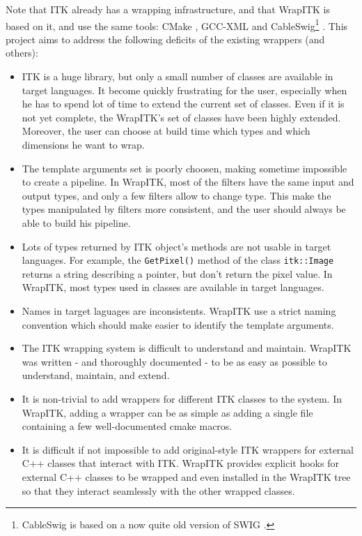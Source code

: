 \documentclass{InsightArticle}
\begin{document}
Note that ITK already has a wrapping infrastructure, and that WrapITK is based
on it, and use the same tools: CMake \cite{CMakeWebSite}, GCC-XML \cite{GccxmlWebsite}
and CableSwig\footnote{CableSwig is based on a now quite old version of SWIG
\cite{SwigWebSite}.} \cite{CableSwigWebSite}. This project aims to
address the following deficits of the existing wrappers (and others):
\begin{itemize}
  \item  ITK is a huge library, but only a small number of classes are available
in target languages. It become quickly frustrating for the user, especially when
he has to spend lot of time to extend the current set of classes. Even if it is
not yet complete, the WrapITK's set of classes have been highly extended. Moreover,
the user can choose at build time which types and which dimensions he want to wrap.

  \item  The template arguments set is poorly choosen, making sometime impossible
to create a pipeline. In WrapITK, most of the filters have the same input and output
types, and only a few filters allow to change type. This make the types manipulated 
by filters more consistent, and the user should always be able to build his pipeline.

  \item  Lots of types returned by ITK object's methods are not usable in target
languages. For example, the \verb$GetPixel()$ method of the class \verb$itk::Image$
returns a string describing a pointer, but don't return the pixel value. In WrapITK,
most types used in classes are available in target languages.

  \item  Names in target laguages are inconsistents. WrapITK use a strict naming
convention which should make easier to identify the template arguments.

  \item  The ITK wrapping system is difficult to understand and maintain. WrapITK was
written - and thoroughly documented - to be as easy as possible to understand,
maintain, and extend.

  \item  It is non-trivial to add wrappers for different ITK classes to the system. In
WrapITK, adding a wrapper can be as simple as adding a single file containing a
few well-documented cmake macros.

  \item  It is difficult if not impossible to add original-style ITK wrappers for
external C++ classes that interact with ITK. WrapITK provides explicit hooks for
external C++ classes to be wrapped and even installed in the WrapITK tree so
that they interact seamlessly with the other wrapped classes.


\end{itemize}
\end{document}
